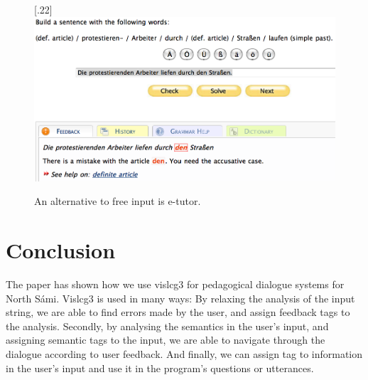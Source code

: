 \documentclass[11pt]{article}
\begin{document}

\begin{figure}[htbp]
\begin{center}
\scalebox{.22}[.22]{\includegraphics{presentation/img/e-tutor-small.png}}\\
\caption{An alternative to free input is e-tutor.}
\label{etutor}
\end{center}
\end{figure}

\section{Conclusion}

The paper has shown how we use vislcg3 for pedagogical dialogue systems for North Sámi. Vislcg3 is used in many ways: By relaxing the analysis of the input string, we are able to find errors made by the user, and assign feedback tags to the analysis. Secondly, by analysing the semantics in the user's input, and assigning semantic tags to the input, we are able to navigate through the dialogue according to user feedback. And finally, we can assign tag to information in the user's input and use it in the program's questions or utterances.  
\end{document}
